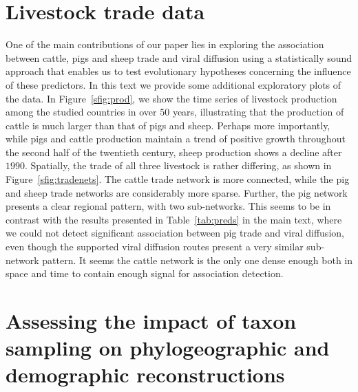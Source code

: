\documentclass[a4paper,10pt]{article}
\begin{document}
\section*{Livestock trade data}

One of the main contributions of our paper lies in exploring the association between cattle, pigs and sheep trade and viral diffusion using a statistically sound approach that enables us to test evolutionary hypotheses concerning the influence of these predictors.
In this text we provide some additional exploratory plots of the data.
In Figure~\ref{sfig:prod}, we show the time series of livestock production among the studied countries in over $50$ years, illustrating that the production of cattle is much larger than that of pigs and sheep.
Perhaps more importantly, while pigs and cattle production maintain a trend of positive growth throughout the second half of the twentieth century, sheep production shows a decline after $1990$.
Spatially, the trade of all three livestock is rather differing, as shown in Figure~\ref{sfig:tradenets}.
The cattle trade network is more connected, while the pig and sheep trade networks are considerably more sparse.
Further, the pig network presents a clear regional pattern, with two sub-networks.
This seems to be in contrast with the results presented in Table~\ref{tab:preds} in the main text, where we could not detect significant association between pig trade and viral diffusion, even though the supported viral diffusion routes present a very similar sub-network pattern.
It seems the cattle network is the only one dense enough both in space and time to contain enough signal for association detection.

\section*{Assessing the impact of taxon sampling on phylogeographic and demographic reconstructions}
\end{document}
